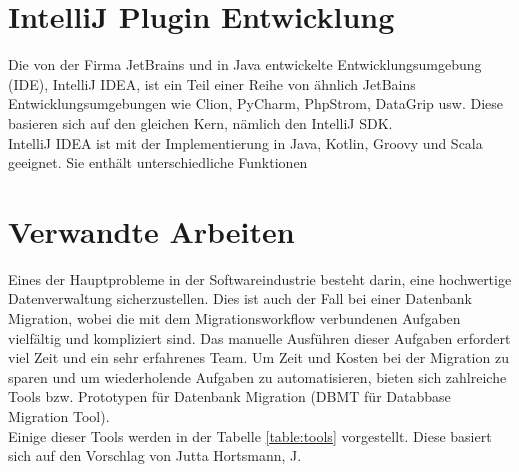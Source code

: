 \section{IntelliJ Plugin Entwicklung}
Die von der Firma JetBrains und in Java entwickelte Entwicklungsumgebung (IDE), IntelliJ IDEA, ist ein Teil einer Reihe von ähnlich JetBains Entwicklungsumgebungen wie Clion, PyCharm, PhpStrom, DataGrip usw. Diese basieren sich auf den gleichen Kern, nämlich den IntelliJ SDK.\\
IntelliJ IDEA ist mit der Implementierung in Java, Kotlin, Groovy und Scala geeignet. Sie enthält unterschiedliche Funktionen



\section{Verwandte Arbeiten}
Eines der Hauptprobleme in der Softwareindustrie besteht darin, eine hochwertige Datenverwaltung sicherzustellen. Dies ist auch der Fall bei einer Datenbank Migration, wobei die mit dem Migrationsworkflow verbundenen Aufgaben vielfältig und kompliziert sind. Das manuelle Ausführen dieser Aufgaben erfordert viel Zeit und ein sehr erfahrenes Team. Um Zeit und Kosten bei der Migration zu sparen und um wiederholende Aufgaben zu automatisieren, bieten sich zahlreiche Tools bzw. Prototypen für Datenbank Migration (DBMT für Databbase Migration Tool). \\
Einige dieser Tools werden in der Tabelle \ref{table:tools} vorgestellt. Diese basiert sich auf den Vorschlag von Jutta Hortsmann, J.

